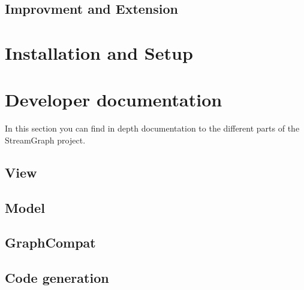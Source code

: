 \documentclass[journal]{IEEEtran}
\begin{document}
\subsection{Improvment and Extension}



\section{Installation and Setup}



\section{Developer documentation}
\noindent In this section you can find in depth documentation to the different
parts of the StreamGraph project.
\subsection{View}



\subsection{Model}



\subsection{GraphCompat}



\subsection{Code generation}


\end{document}
